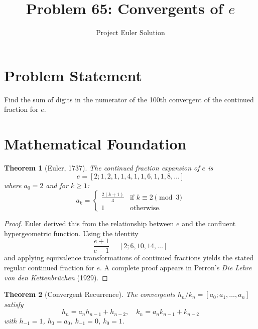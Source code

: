 \documentclass[12pt,a4paper]{article}
\title{Problem 65: Convergents of $e$}
\author{Project Euler Solution}
\date{}
\newtheorem{theorem}{Theorem}
\begin{document}
\maketitle

\section{Problem Statement}

Find the sum of digits in the numerator of the 100th convergent of the continued fraction for $e$.

\section{Mathematical Foundation}

\begin{theorem}[Euler, 1737]
The continued fraction expansion of $e$ is
\[
e = [2; 1, 2, 1, 1, 4, 1, 1, 6, 1, 1, 8, \ldots]
\]
where $a_0 = 2$ and for $k \ge 1$:
\[
a_k = \begin{cases} \frac{2(k+1)}{3} & \text{if } k \equiv 2 \pmod{3} \\ 1 & \text{otherwise.} \end{cases}
\]
\end{theorem}

\begin{proof}
Euler derived this from the relationship between $e$ and the confluent hypergeometric function. Using the identity
\[
\frac{e+1}{e-1} = [2; 6, 10, 14, \ldots]
\]
and applying equivalence transformations of continued fractions yields the stated regular continued fraction for $e$. A complete proof appears in Perron's \emph{Die Lehre von den Kettenbr\"uchen} (1929).
\end{proof}

\begin{theorem}[Convergent Recurrence]
The convergents $h_n/k_n = [a_0; a_1, \ldots, a_n]$ satisfy
\[
h_n = a_n h_{n-1} + h_{n-2}, \quad k_n = a_n k_{n-1} + k_{n-2}
\]
with $h_{-1} = 1$, $h_0 = a_0$, $k_{-1} = 0$, $k_0 = 1$.
\end{theorem}
\end{document}
